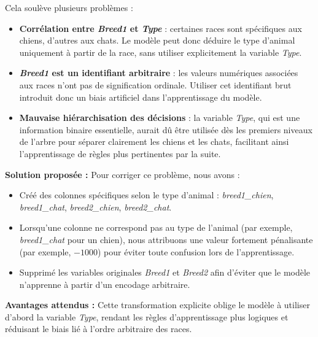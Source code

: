 \documentclass[a4paper,12pt]{article}
\begin{document}
 
Cela soulève plusieurs problèmes :
 
\begin{itemize}

    \item \textbf{Corrélation entre \textit{Breed1} et \textit{Type}} : certaines races sont spécifiques aux chiens, d'autres aux chats. Le modèle peut donc déduire le type d'animal uniquement à partir de la race, sans utiliser explicitement la variable \textit{Type}.

    \item \textbf{\textit{Breed1} est un identifiant arbitraire} : les valeurs numériques associées aux races n'ont pas de signification ordinale. Utiliser cet identifiant brut introduit donc un biais artificiel dans l'apprentissage du modèle.

    \item \textbf{Mauvaise hiérarchisation des décisions} : la variable \textit{Type}, qui est une information binaire essentielle, aurait dû être utilisée dès les premiers niveaux de l'arbre pour séparer clairement les chiens et les chats, facilitant ainsi l'apprentissage de règles plus pertinentes par la suite.

\end{itemize}
 
\bigskip
 
\textbf{Solution proposée :} Pour corriger ce problème, nous avons :
 
\begin{itemize}

    \item Créé des colonnes spécifiques selon le type d'animal : \textit{breed1\_chien}, \textit{breed1\_chat}, \textit{breed2\_chien}, \textit{breed2\_chat}. 

    \item Lorsqu'une colonne ne correspond pas au type de l'animal (par exemple, \textit{breed1\_chat} pour un chien), nous attribuons une valeur fortement pénalisante (par exemple, $-1000$) pour éviter toute confusion lors de l'apprentissage.

    \item Supprimé les variables originales \textit{Breed1} et \textit{Breed2} afin d'éviter que le modèle n'apprenne à partir d'un encodage arbitraire.

\end{itemize}
 
\bigskip
 
\textbf{Avantages attendus :} Cette transformation explicite oblige le modèle à utiliser d'abord la variable \textit{Type}, rendant les règles d'apprentissage plus logiques et réduisant le biais lié à l'ordre arbitraire des races.
 
\end{document}
